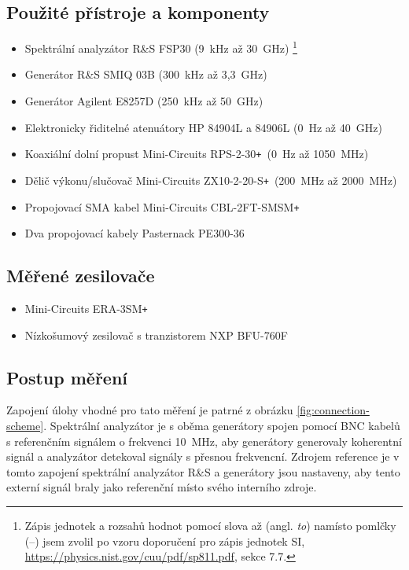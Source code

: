 \documentclass[11pt,a4paper]{article}
\newcommand{\plus}{{\texttt{+}}}
\begin{document}
\subsection*{Použité přístroje a komponenty}
\begin{itemize}
    \item Spektrální analyzátor R\&S FSP30 (9~kHz až 30~GHz)%
        \footnote{Zápis jednotek a rozsahů hodnot pomocí slova až (angl. \emph{to}) namísto pomlčky (--) jsem zvolil po vzoru doporučení pro zápis jednotek SI, \url{https://physics.nist.gov/cuu/pdf/sp811.pdf}, sekce 7.7.}
    \item Generátor R\&S SMIQ 03B (300~kHz až 3,3~GHz)
    \item Generátor Agilent E8257D (250~kHz až 50~GHz)
    \item Elektronicky řiditelné atenuátory HP 84904L a 84906L (0~Hz až 40~GHz)
    \item Koaxiální dolní propust Mini-Circuits RPS-2-30\plus~(0~Hz až 1050~MHz)
    \item Dělič výkonu/slučovač Mini-Circuits ZX10-2-20-S\plus~(200~MHz až 2000~MHz)
    \item Propojovací SMA kabel Mini-Circuits CBL-2FT-SMSM\plus
    \item Dva propojovací kabely Pasternack PE300-36
\end{itemize}


\subsection*{Měřené zesilovače}
\begin{itemize}
    \item Mini-Circuits ERA-3SM\plus
    \item Nízkošumový zesilovač s tranzistorem NXP BFU-760F
\end{itemize}

\subsection*{Postup měření}
Zapojení úlohy vhodné pro tato měření je patrné z obrázku \ref{fig:connection-scheme}. Spektrální analyzátor je s oběma generátory spojen pomocí BNC kabelů s referenčním signálem o frekvenci 10~MHz, aby generátory generovaly koherentní signál a analyzátor detekoval signály s přesnou frekvencní. Zdrojem reference je v tomto zapojení spektrální analyzátor R\&S a generátory jsou nastaveny, aby tento externí signál braly jako referenční místo svého interního zdroje.
\end{document}
